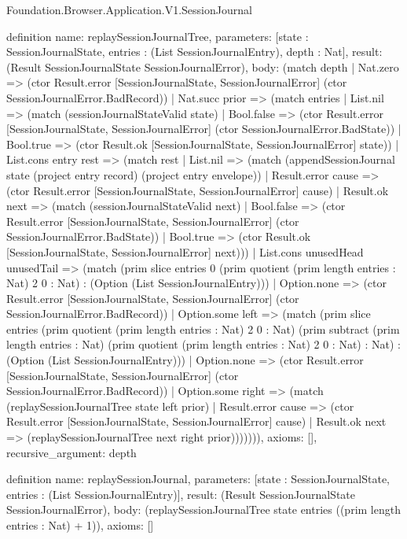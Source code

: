 \begin{lexlean}{Foundation.Browser.Application.V1.SessionJournal}
\begin{semanticmodule}
definition{
  name: replaySessionJournalTree,
  parameters: [state : SessionJournalState, entries : (List SessionJournalEntry), depth : Nat],
  result: (Result SessionJournalState SessionJournalError),
  body: (match depth
    | Nat.zero => (ctor Result.error [SessionJournalState, SessionJournalError] (ctor SessionJournalError.BadRecord))
    | Nat.succ prior => (match entries
      | List.nil => (match (sessionJournalStateValid state)
        | Bool.false => (ctor Result.error [SessionJournalState, SessionJournalError] (ctor SessionJournalError.BadState))
        | Bool.true => (ctor Result.ok [SessionJournalState, SessionJournalError] state))
      | List.cons entry rest => (match rest
        | List.nil => (match (appendSessionJournal state (project entry record) (project entry envelope))
          | Result.error cause => (ctor Result.error [SessionJournalState, SessionJournalError] cause)
          | Result.ok next => (match (sessionJournalStateValid next)
            | Bool.false => (ctor Result.error [SessionJournalState, SessionJournalError] (ctor SessionJournalError.BadState))
            | Bool.true => (ctor Result.ok [SessionJournalState, SessionJournalError] next)))
        | List.cons unusedHead unusedTail => (match (prim slice entries 0 (prim quotient (prim length entries : Nat) 2 0 : Nat) : (Option (List SessionJournalEntry)))
          | Option.none => (ctor Result.error [SessionJournalState, SessionJournalError] (ctor SessionJournalError.BadRecord))
          | Option.some left => (match (prim slice entries (prim quotient (prim length entries : Nat) 2 0 : Nat) (prim subtract (prim length entries : Nat) (prim quotient (prim length entries : Nat) 2 0 : Nat) : Nat) : (Option (List SessionJournalEntry)))
            | Option.none => (ctor Result.error [SessionJournalState, SessionJournalError] (ctor SessionJournalError.BadRecord))
            | Option.some right => (match (replaySessionJournalTree state left prior)
              | Result.error cause => (ctor Result.error [SessionJournalState, SessionJournalError] cause)
              | Result.ok next => (replaySessionJournalTree next right prior))))))),
  axioms: [],
  recursive_argument: depth
}

definition{
  name: replaySessionJournal,
  parameters: [state : SessionJournalState, entries : (List SessionJournalEntry)],
  result: (Result SessionJournalState SessionJournalError),
  body: (replaySessionJournalTree state entries ((prim length entries : Nat) + 1)),
  axioms: []
}
\end{semanticmodule}
\end{lexlean}
